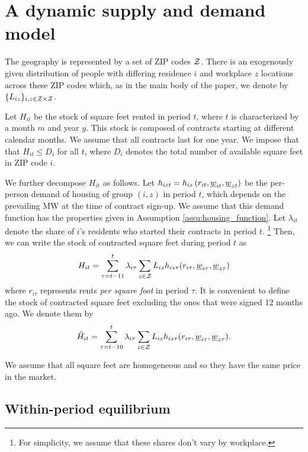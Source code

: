 
\section{A dynamic supply and demand model}\label{sec:dyn_theory_model}

The geography is represented by a set of ZIP codes $\mathcal{Z}$.
There is an exogenously given distribution of people with differing residence $i$ and 
workplace $z$ locations across these ZIP codes which,
as in the main body of the paper, we denote by $\{L_{iz}\}_{i,z\in\mathcal{Z}\times\mathcal{Z}}$.

Let $H_{it}$ be the stock of square feet rented in period $t$, where $t$ is 
characterized by a month $m$ and year $y$.
This stock is composed of contracts starting at different calendar months. 
We assume that all contracts last for one year.
We impose that that $H_{it} \leq D_i$ for all $t$, where $D_i$ denotes the total 
number of available square feet in ZIP code $i$.

We further decompose $H_{it}$ as follows. 
Let $h_{izt} = h_{iz}\left(r_{it}, \underline{w}_{it}, \underline{w}_{zt}\right)$ be the 
per-person demand of housing of group $(i,z)$ in period $t$,
which depends on the prevailing MW at the time of contract sign-up.
We assume that this demand function has the properties given in Assumption 
\ref{assu:housing_function}.
Let $\lambda_{it}$ denote the share of $i$'s residents who started their contracts 
in period $t$.%
\footnote{For simplicity, we assume that these shares don't vary by workplace.}
Then, we can write the stock of contracted square feet during period $t$ as
$$
H_{it} = \sum_{\tau = t - 11}^{t} \lambda_{i\tau} \sum_{z\in\mathcal{Z}} L_{iz} 
h_{iz\tau} (r_{i\tau}, \underline{w}_{i\tau}, \underline{w}_{z\tau})
$$
where 
$r_{i\tau}$ represents rents \textit{per square foot} in period $\tau$.
It is convenient to define the stock of contracted square feet excluding the ones 
that were signed 12 months ago. We denote them by
$$
\tilde H_{it} = \sum_{\tau = t - 10}^{t} \lambda_{i\tau} \sum_{z\in\mathcal{Z}} L_{iz} 
h_{iz\tau} (r_{i\tau}, \underline{w}_{i\tau}, \underline{w}_{z\tau}) .
$$

We assume that all square feet are homogeneous and so they have the same price in 
the market.

\subsection*{Within-period equilibrium}

